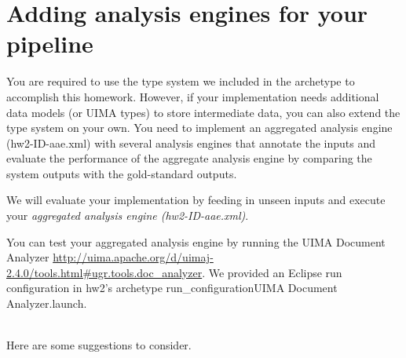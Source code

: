
\section{Adding analysis engines for your pipeline}

You are required to use the type system we included in the archetype to
accomplish this homework. However, if your implementation needs additional data
models (or UIMA types) to store intermediate data, you can also extend the type
system on your own. 
You need to implement an aggregated analysis engine (hw2-ID-aae.xml) with several analysis engines
that annotate the inputs and evaluate the performance of the aggregate analysis engine by
comparing the system outputs with the gold-standard outputs.

We will evaluate your implementation by feeding in unseen inputs and execute your 
\emph{aggregated analysis engine (hw2-ID-aae.xml)}.

You can test your aggregated analysis engine by running the UIMA Document Analyzer 
\url{http://uima.apache.org/d/uimaj-2.4.0/tools.html#ugr.tools.doc_analyzer}. 
We provided an Eclipse run configuration in hw2's archetype run\_configuration\/UIMA Document Analyzer.launch. 

~\\
Here are some suggestions to consider.

